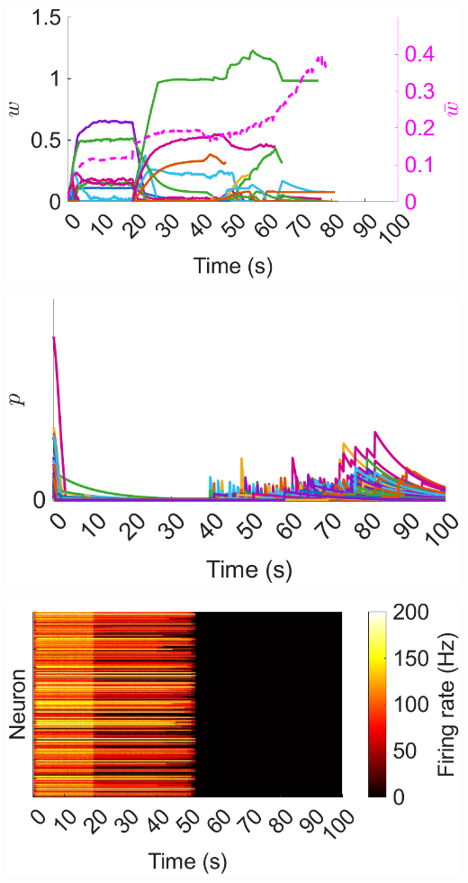 \documentclass[utf8]{FrontiersinHarvard} %
\begin{document}
\begin{subfigure}
\begin{minipage}[b]{0.32\textwidth}
        \caption{}
        \label{figs:results:AD:firing_rate}
    \end{minipage}%
\setcounter{figure}{4}
\setcounter{subfigure}{3}
    \centering
    \begin{minipage}[b]{0.32\textwidth}
        \includegraphics[width=\linewidth]{AD/weights_E2E_traces}
        \caption{}
        \label{figs:results:AD:weights_traces}
    \end{minipage}%
\setcounter{figure}{4}
\setcounter{subfigure}{4}
    \centering
    \begin{minipage}[b]{0.32\textwidth}
        \includegraphics[width=\linewidth]{AD/resource_pools}
        \caption{}
        \label{figs:results:AD:resource_pools}
    \end{minipage}%
\setcounter{figure}{4}
\setcounter{subfigure}{5}
    \begin{minipage}[b]{0.32\textwidth}
        \includegraphics[width=\linewidth]{AD/Hz_no_resources}

\end{minipage}
\end{subfigure}
\end{document}
